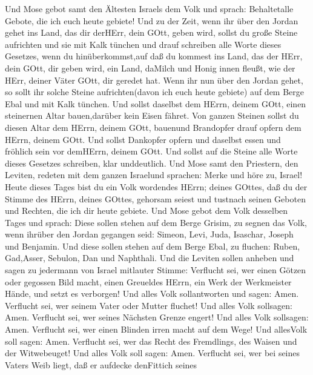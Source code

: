  Und Mose gebot samt den Ältesten Israels dem Volk und
sprach: Behaltetalle Gebote, die ich euch heute gebiete! 
Und zu der Zeit, wenn ihr über den Jordan gehet ins Land, das dir
derHErr, dein GOtt, geben wird, sollst du große Steine aufrichten und
sie mit Kalk tünchen  und drauf schreiben alle Worte dieses
Gesetzes, wenn du hinüberkommst,auf daß du kommest ins Land, das der
HErr, dein GOtt, dir geben wird, ein Land, daMilch und Honig innen
fleußt, wie der HErr, deiner Väter GOtt, dir geredet hat. 
Wenn ihr nun über den Jordan gehet, so sollt ihr solche Steine
aufrichten(davon ich euch heute gebiete) auf dem Berge Ebal und mit Kalk
tünchen.  Und sollst daselbst dem HErrn, deinem GOtt, einen
steinernen Altar bauen,darüber kein Eisen fähret.  Von
ganzen Steinen sollst du diesen Altar dem HErrn, deinem GOtt, bauenund
Brandopfer drauf opfern dem HErrn, deinem GOtt.  Und sollst
Dankopfer opfern und daselbst essen und fröhlich sein vor demHErrn,
deinem GOtt.  Und sollst auf die Steine alle Worte dieses
Gesetzes schreiben, klar unddeutlich.  Und Mose samt den
Priestern, den Leviten, redeten mit dem ganzen Israelund sprachen: Merke
und höre zu, Israel! Heute dieses Tages bist du ein Volk wordendes
HErrn; deines GOttes,  daß du der Stimme des HErrn, deines
GOttes, gehorsam seiest und tustnach seinen Geboten und Rechten, die ich
dir heute gebiete.  Und Mose gebot dem Volk desselben Tages
und sprach:  Diese sollen stehen auf dem Berge Grisim, zu
segnen das Volk, wenn ihrüber den Jordan gegangen seid: Simeon, Levi,
Juda, Isaschar, Joseph und Benjamin.  Und diese sollen
stehen auf dem Berge Ebal, zu fluchen: Ruben, Gad,Asser, Sebulon, Dan
und Naphthali.  Und die Leviten sollen anheben und sagen zu
jedermann von Israel mitlauter Stimme:  Verflucht sei, wer
einen Götzen oder gegossen Bild macht, einen Greueldes HErrn, ein Werk
der Werkmeister Hände, und setzt es verborgen! Und alles Volk
sollantworten und sagen: Amen.  Verflucht sei, wer seinem
Vater oder Mutter fluchet! Und alles Volk sollsagen: Amen. 
Verflucht sei, wer seines Nächsten Grenze engert! Und alles Volk
sollsagen: Amen.  Verflucht sei, wer einen Blinden irren
macht auf dem Wege! Und allesVolk soll sagen: Amen. 
Verflucht sei, wer das Recht des Fremdlings, des Waisen und der
Witwebeuget! Und alles Volk soll sagen: Amen.  Verflucht
sei, wer bei seines Vaters Weib liegt, daß er aufdecke denFittich seines
